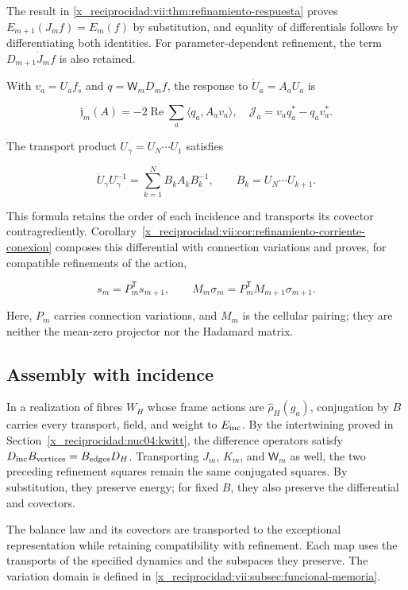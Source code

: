 The result in \cref{x_reciprocidad:vii:thm:refinamiento-respuesta} proves \(E_{m+1}(J_mf)=E_m(f)\) by substitution, and equality of differentials follows by differentiating both identities. For parameter-dependent refinement, the term \(D_{m+1}\dot J_mf\) is also retained.

With \(v_a=U_af_s\) and \(q=\mathsf W_mD_mf\), the response to \(\dot U_a=A_aU_a\) is

\[
\mathfrak j_m(A)=-2\operatorname{Re}\sum_a\langle q_a,A_av_a\rangle,
\quad \mathcal J_a=v_aq_a^*-q_av_a^*.
\]

The transport product \(U_\gamma=U_N\cdots U_1\) satisfies

\[
\dot U_\gamma U_\gamma^{-1}
=\sum_{k=1}^N B_kA_kB_k^{-1},\qquad B_k=U_N\cdots U_{k+1}.
\]

This formula retains the order of each incidence and transports its covector contragrediently. Corollary~\ref{x_reciprocidad:vii:cor:refinamiento-corriente-conexion} composes this differential with connection variations and proves, for compatible refinements of the action,

\[
s_m=P_m^{\mathsf T}s_{m+1},\qquad
M_m\sigma_m=P_m^{\mathsf T}M_{m+1}\sigma_{m+1}.
\]

Here, \(P_m\) carries connection variations, and \(M_m\) is the cellular pairing; they are neither the mean-zero projector nor the Hadamard matrix.

\subsection{Assembly with incidence}

In a realization of fibres \(W_H\) whose frame actions are \(\widehat\rho_H(g_a)\), conjugation by \(B\) carries every transport, field, and weight to \(E_{\rm inc}\). By the intertwining proved in Section~\ref{x_reciprocidad:nuc04:kwitt}, the difference operators satisfy \(D_{\rm inc}B_{\rm vertices}=B_{\rm edges}D_H\). Transporting \(J_m\), \(K_m\), and \(\mathsf W_m\) as well, the two preceding refinement squares remain the same conjugated squares. By substitution, they preserve energy; for fixed \(B\), they also preserve the differential and covectors.

The balance law and its covectors are transported to the exceptional representation while retaining compatibility with refinement. Each map uses the transports of the specified dynamics and the subspaces they preserve. The variation domain is defined in \cref{x_reciprocidad:vii:subsec:funcional-memoria}.
